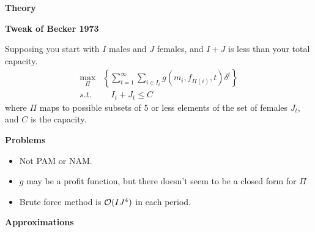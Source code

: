 \documentclass[grey,handout]{beamer}
\renewcommand{\frametitle}[1]{\begin{center}\textbf{#1}\end{center}}
\def\BigO{{\cal O}}
\begin{document}
\begin{frame}
  \frametitle{Theory}
\end{frame}
  \begin{frame}
  \frametitle{Tweak of Becker 1973}
  Supposing you start with $I$ males and $J$ females, and $I+J$  is less than your total capacity.
  \begin{align*}
    \max_\Pi&\left\{ \sum_{t=1}^{\infty}\sum_{i\in I_t}g\left(m_i,f_{\Pi(i)},t\right)\delta^t \right\}\\
    s.t. &\quad I_t+J_t\leq C
  \end{align*}
  where $\Pi$ maps to possible subsets of 5 or less elements of the set of females $J_t$, and $C$ is the capacity.
\end{frame}
\begin{frame}
  \frametitle{Problems}
  \begin{itemize}
    \item Not PAM or NAM.
    \item $g$ may be a profit function, but there doesn't seem to be a closed form for $\Pi$
    
    \item Brute force method is $\BigO(IJ^4)$ in each period.
  \end{itemize}
\end{frame}
  \begin{frame}
  \frametitle{Approximations}
  \end{frame}
\end{document}
